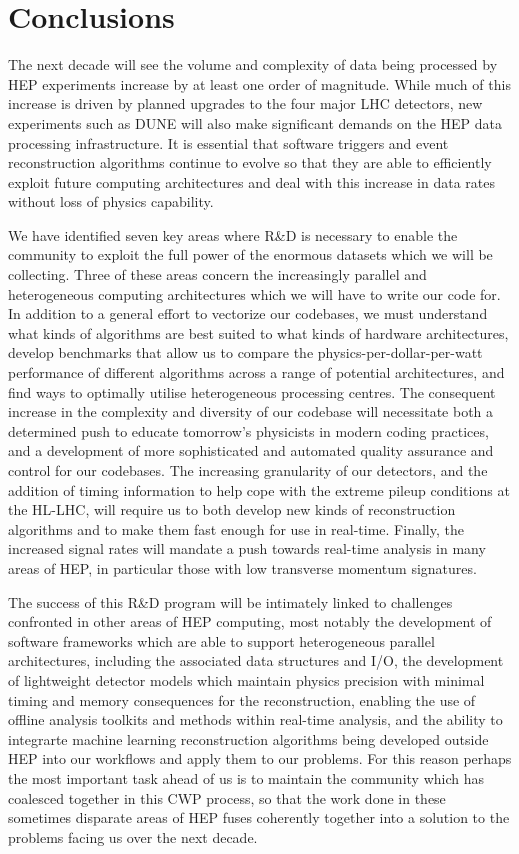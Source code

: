 \section{Conclusions}

The next decade will see the volume and complexity of data being processed by HEP experiments increase by at least one order of magnitude. While much of this increase is driven by planned upgrades to the four major LHC detectors, new experiments such as DUNE will also make significant demands on the HEP data processing infrastructure. It is essential that software triggers and event reconstruction algorithms continue to evolve so that they are able to efficiently exploit future computing architectures and deal with this increase in data rates without loss of physics capability. 

We have identified seven key areas where R\&D is necessary to enable the community to exploit the full power of the enormous datasets which we will be collecting. Three of these areas concern the increasingly parallel and heterogeneous computing architectures which we will have to write our code for. In addition to a general effort to vectorize our codebases, we must understand what kinds of algorithms are best suited to what kinds of hardware architectures, develop benchmarks that allow us to compare the physics-per-dollar-per-watt performance of different algorithms across a range of potential architectures, and find ways to optimally utilise heterogeneous processing centres. The consequent increase in the complexity and diversity of our codebase will necessitate both a determined push to educate tomorrow’s physicists in modern coding practices, and a development of more sophisticated and automated quality assurance and control for our codebases. The increasing granularity of our detectors, and the addition of timing information to help cope with the extreme pileup conditions at the HL-LHC, will require us to both develop new kinds of reconstruction algorithms and to make them fast enough for use in real-time. Finally, the increased signal rates will mandate a push towards real-time analysis in many areas of HEP, in particular those with low transverse momentum signatures.

The success of this R\&D program will be intimately linked to challenges confronted in other areas of HEP computing, most notably the development of software frameworks which are able to support heterogeneous parallel architectures, including the associated data structures and I/O, the development of lightweight detector models which maintain physics precision with minimal timing and memory consequences for the reconstruction, enabling the use of offline analysis toolkits and methods within real-time analysis, and the ability to integrarte machine learning reconstruction algorithms being developed outside HEP into our workflows and apply them to our problems. For this reason perhaps the most important task ahead of us is to maintain the community which has coalesced together in this CWP process, so that the work done in these sometimes disparate areas of HEP fuses coherently together into a solution to the problems facing us over the next decade.

